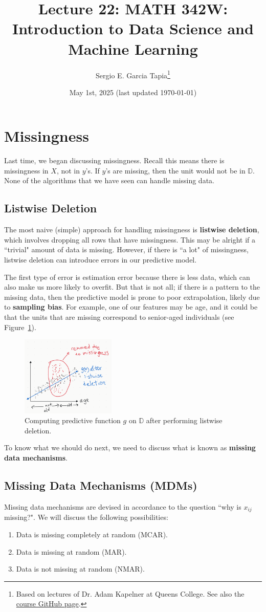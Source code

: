 \documentclass[12pt, a4paper]{article}
\title{Lecture 22: MATH 342W: Introduction to Data Science and Machine Learning}
\author{Sergio E. Garcia Tapia\thanks{Based on lectures of Dr. Adam Kapelner at Queens College.
See also the \href{https://github.com/kapelner/QC_MATH_342W_Spring_2025}{course GitHub page}.}}
\date{May 1st, 2025 (last updated \today)}
\theoremstyle{definition}
\begin{document}
	\maketitle
	\section{Missingness}
	Last time, we began discussing missingness. Recall this means there is
	missingness in $X$, not in $y$'s. If $y$'s are missing, then the unit would
	not be in $\mathbb{D}$. None of the algorithms that we have seen can handle
	missing data.
	
	\subsection{Listwise Deletion}
	The most naive (simple) approach for handling missingness is \textbf{listwise deletion},
	which involves dropping all rows that have missingness. This may be alright if
	a ``trivial" amount of data is missing. However, if there is ``a lot" of missingness,
	listwise deletion can introduce errors in our predictive model.
	
	The first type of error is estimation error because there is less data,
	which can also make us more likely to overfit. But that is not all; if
	there is a pattern to the missing data, then the predictive model is
	prone to poor extrapolation, likely due to \textbf{sampling bias}.
	For example, one of our features may be age, and it could be that the
	units that are missing correspond to senior-aged individuals
	(see Figure~\ref{fig:model-after-listwise-deletion}).
	\begin{figure}
		\centering
		\includegraphics[width=0.4\textwidth]{model-after-listwise-deletion}
		\caption{Computing predictive function $g$ on $\mathbb{D}$ after
		performing listwise deletion.}
		\label{fig:model-after-listwise-deletion}
	\end{figure}
	To know what we should do next, we need to discuss what is known as
	\textbf{missing data mechanisms}.
	\subsection{Missing Data Mechanisms (MDMs)}
	Missing data mechanisms are devised in accordance to the question ``why is $x_{ij}$
	missing?". We will discuss the following possibilities:
	\begin{enumerate}[label=(\arabic*)]
		\item Data is missing completely at random (MCAR).
		\item Data is missing at random (MAR).
		\item Data is not missing at random (NMAR).
	\end{enumerate}
\end{document}
